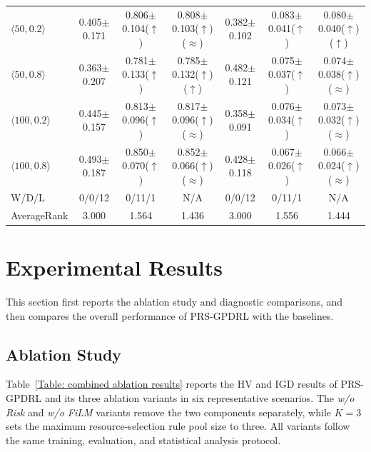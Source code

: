 \documentclass[10pt,journal]{IEEEtran}
\begin{document}
\begin{table}[!t]
{\begin{tabular}{@{}lcccccc@{}}
$\langle50,0.2\rangle$ & 0.405$\pm$0.171 & 0.806$\pm$0.104($\uparrow$) & 0.808$\pm$0.103($\uparrow$)($\approx$) & 0.382$\pm$0.102 & 0.083$\pm$0.041($\uparrow$) & 0.080$\pm$0.040($\uparrow$)($\uparrow$) \\
$\langle50,0.8\rangle$ & 0.363$\pm$0.207 & 0.781$\pm$0.133($\uparrow$) & 0.785$\pm$0.132($\uparrow$)($\uparrow$) & 0.482$\pm$0.121 & 0.075$\pm$0.037($\uparrow$) & 0.074$\pm$0.038($\uparrow$)($\approx$) \\
$\langle100,0.2\rangle$ & 0.445$\pm$0.157 & 0.813$\pm$0.096($\uparrow$) & 0.817$\pm$0.096($\uparrow$)($\approx$) & 0.358$\pm$0.091 & 0.076$\pm$0.034($\uparrow$) & 0.073$\pm$0.032($\uparrow$)($\approx$) \\
$\langle100,0.8\rangle$ & 0.493$\pm$0.187 & 0.850$\pm$0.070($\uparrow$) & 0.852$\pm$0.066($\uparrow$)($\approx$) & 0.428$\pm$0.118 & 0.067$\pm$0.026($\uparrow$) & 0.066$\pm$0.024($\uparrow$)($\approx$) \\
\midrule
W/D/L & 0/0/12 & 0/11/1 & N/A & 0/0/12 & 0/11/1 & N/A \\
AverageRank & 3.000 & 1.564 & 1.436 & 3.000 & 1.556 & 1.444 \\
\bottomrule
\end{tabular}}
\end{table}

\section{Experimental Results}
\label{Sec: experimental results}

This section first reports the ablation study and diagnostic comparisons, and then compares the overall performance of PRS-GPDRL with the baselines.

\subsection{Ablation Study}
\label{Sec: ablation design analysis}

Table~\ref{Table: combined ablation results} reports the HV and IGD results of PRS-GPDRL and its three ablation variants in six representative scenarios. The \emph{w/o Risk} and \emph{w/o FiLM} variants remove the two components separately, while $K=3$ sets the maximum resource-selection rule pool size to three. All variants follow the same training, evaluation, and statistical analysis protocol.
\end{document}
